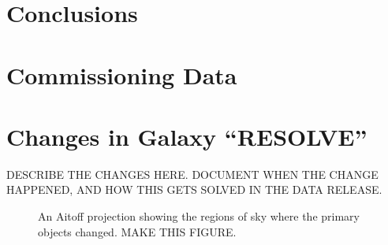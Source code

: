 \documentclass[iop,apj]{emulateapj}
\begin{document}
\section{Conclusions}


\appendix

\section{Commissioning Data}

\section{Changes in Galaxy ``RESOLVE''}

DESCRIBE THE CHANGES HERE. DOCUMENT WHEN THE CHANGE HAPPENED, AND HOW THIS 
GETS SOLVED IN THE DATA RELEASE.

\begin{figure}
\caption{An Aitoff projection showing the regions of sky where the primary
objects changed. MAKE THIS FIGURE.}
\end{figure}
\end{document}
